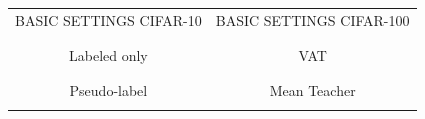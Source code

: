 \setlength{\tabcolsep}{.08cm}
\newcommand{\WWW}{5.5cm}
\newcommand{\RRR}{2cm}
\begin{table}[!h]
	\setlength\extrarowheight{-10pt}
    \begin{tabular}{c c}
		{\Large BASIC SETTINGS CIFAR-10}
		&
		{\Large BASIC SETTINGS CIFAR-100}
		\\
		\begin{minipage}[t]{.5\textwidth}
		\strut\vspace*{-\baselineskip}\newline
				
		\end{minipage}
		&
		\begin{minipage}[t]{.5\textwidth}
		\strut\vspace*{-\baselineskip}\newline
				
		\end{minipage}
		\\ %
		\\ %
		{\Large Labeled only}
		&
		{\Large VAT}
		\\
		\begin{minipage}[t]{.5\textwidth}
		\strut\vspace*{-\baselineskip}\newline
				
		\end{minipage}
		&
		\begin{minipage}[t]{.5\textwidth}
		\strut\vspace*{-\baselineskip}\newline
				
		\end{minipage}
		\\ %
		\\ %
		{\Large Pseudo-label}
		&
		{\Large Mean Teacher}
		\\
		\begin{minipage}[t]{.5\textwidth}
		\strut\vspace*{-\baselineskip}\newline
				
		\end{minipage}
		&
		\begin{minipage}[t]{.5\textwidth}
		\strut\vspace*{-\baselineskip}\newline
				
		\end{minipage}
		\\ %

\end{tabular}
\end{table}
